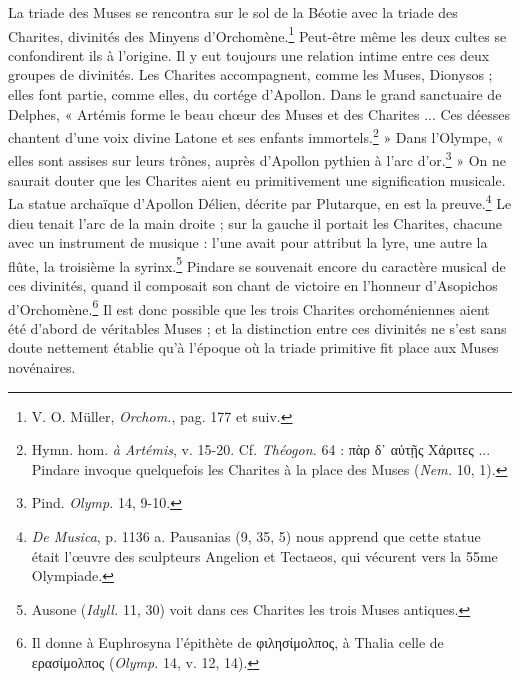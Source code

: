 \documentclass[a4paper, 11pt, oneside, polutonikogreek, french]{article}
\begin{document}
La triade des Muses se rencontra sur le sol de la Béotie avec la triade des Charites, divinités des Minyens d'Orchomène.\footnote{V. O. Müller, \emph{Orchom.}, pag. 177 et suiv.} Peut-être même les deux cultes se confondirent ils à l'origine. Il y eut toujours une relation intime entre ces deux groupes de divinités. Les Charites accompagnent, comme les Muses, Dionysos ; elles font partie, comme elles, du cortége d'Apollon. Dans le grand sanctuaire de Delphes, « Artémis forme le beau chœur des Muses et des Charites ... Ces déesses chantent d'une voix divine Latone et ses enfants immortels.\footnote{Hymn. hom. \emph{à Artémis}, v. 15-20. Cf. \emph{Théogon.} 64 : πὰρ δ᾽ αὐτῇς Χάριτες ... Pindare invoque quelquefois les Charites à la place des Muses (\emph{Nem.} 10, 1).} » Dans l'Olympe, « elles sont assises sur leurs trônes, auprès d'Apollon pythien à l'arc d'or.\footnote{Pind. \emph{Olymp.} 14, 9-10.} » On ne saurait douter que les Charites aient eu primitivement une signification musicale. La statue archaïque d'Apollon Délien, décrite par Plutarque, en est la preuve.\footnote{\emph{De Musica}, p. 1136 a. Pausanias (9, 35, 5) nous apprend que cette statue était l'œuvre des sculpteurs Angelion et Tectaeos, qui vécurent vers la 55me Olympiade.} Le dieu tenait l'arc de la main droite ; sur la gauche il portait les Charites, chacune avec un instrument de musique : l'une avait pour attribut la lyre, une autre la flûte, la troisième la syrinx.\footnote{Ausone (\emph{Idyll.} 11, 30) voit dans ces Charites les trois Muses antiques.} Pindare se souvenait encore du caractère musical de ces divinités, quand il composait son chant de victoire en l'honneur d'Asopichos d'Orchomène.\footnote{Il donne à Euphrosyna l'épithète de φιλησίμολπος, à Thalia celle de ερασίμολπος (\emph{Olymp.} 14, v. 12, 14).} Il est donc possible que les trois Charites orchoméniennes aient été d'abord de véritables Muses ; et la distinction entre ces divinités ne s'est sans doute nettement établie qu'à l'époque où la triade primitive fit place aux Muses novénaires.
\end{document}
